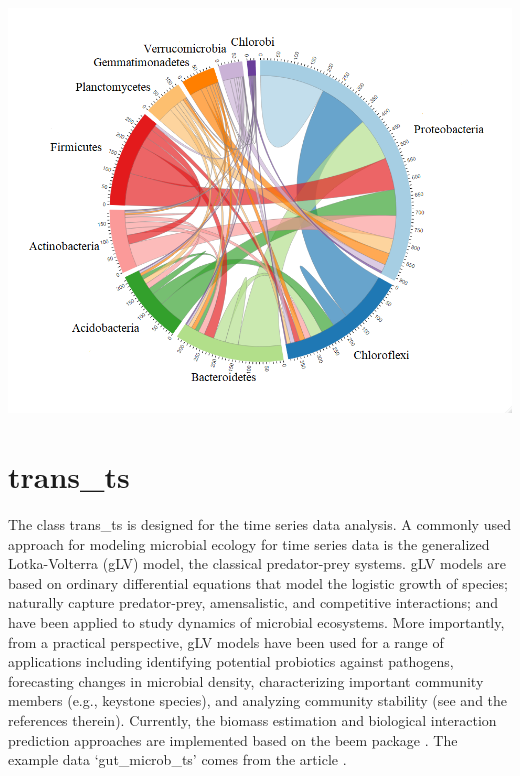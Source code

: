 \documentclass[
]{book}
\begin{document}
\begin{center}\includegraphics[width=700px]{Images/plot_sum_links} \end{center}

\hypertarget{trans_ts}{%
\section{trans\_ts}\label{trans_ts}}

The class trans\_ts is designed for the time series data analysis.
A commonly used approach for modeling microbial ecology for time series data is the generalized Lotka-Volterra (gLV) model, the classical predator-prey systems.
gLV models are based on ordinary differential equations that model the logistic growth of species;
naturally capture predator-prey, amensalistic, and competitive interactions; and have been applied to study dynamics of microbial ecosystems.
More importantly, from a practical perspective, gLV models have been used for a range of applications including identifying potential probiotics
against pathogens, forecasting changes in microbial density, characterizing important community members (e.g., keystone species),
and analyzing community stability (see \citep{Li_expectation_2019} and the references therein).
Currently, the biomass estimation and biological interaction prediction approaches are implemented based on the beem package \citep{Li_expectation_2019}.
The example data `gut\_microb\_ts' comes from the article \citep{Gibbons_twodynamic_2017}.
\end{document}
